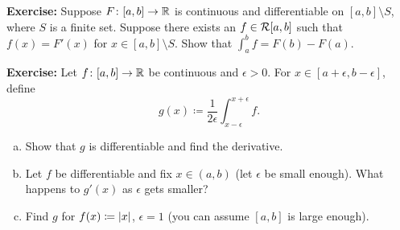 \documentclass[10pt,aspectratio=149]{beamer}
\begin{document}
\begin{frame}

\textbf{Exercise:}
Suppose $F \colon [a,b] \to {\mathbb{R}}$ is continuous and differentiable
on $[a,b] \setminus S$, where $S$ is a finite set.
\pause
Suppose there
exists an $f \in {\mathcal{R}}[a,b]$ such that $f(x) = F'(x)$ for $x \in [a,b]
\setminus S$.
\pause
Show that
$\int_a^b f = F(b)-F(a)$.

%

\pause
\medskip

\textbf{Exercise:}
Let $f \colon [a,b] \to {\mathbb{R}}$ be continuous and $\epsilon > 0$.
For $x \in [a+\epsilon,b-\epsilon]$, define
\begin{equation*}
g(x) \coloneqq \frac{1}{2\epsilon} \int_{x-\epsilon}^{x+\epsilon} f .
\end{equation*}
\begin{enumerate}[a)]
\item\pause
Show that $g$ is differentiable and find the derivative.
\item\pause
Let $f$ be differentiable and fix $x \in (a,b)$ (let $\epsilon$
be small enough).  What happens to $g'(x)$ as $\epsilon$ gets smaller?
\item\pause
Find $g$ for $f(x) \coloneqq \left\lvert {x} \right\rvert$, $\epsilon = 1$ (you can assume 
$[a,b]$ is large enough).
\end{enumerate}

\end{frame}
\end{document}
